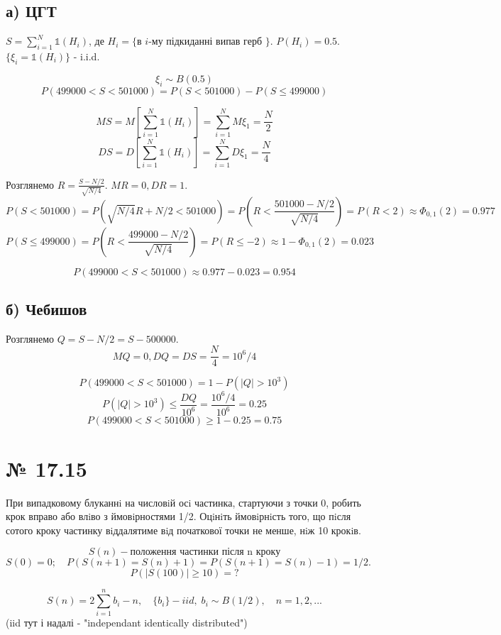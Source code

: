 \documentclass[11pt, a4paper]{article} %
\begin{document}
\subsection*{а) ЦГТ}
$S = \sum_{i=1}^N \mathbb{1}(H_i)$, де $H_i = \{$в $i$-му підкиданні випав герб $\}$.
$P(H_i) = 0.5$. $\{\xi_i = \mathbb{1}(H_i)\}$ - i.i.d.

$$\xi_i \sim B(0.5)$$
$$P(499000 < S < 501000) = P(S < 501000) - P(S \le 499000)$$

$$MS = M\left[\sum_{i=1}^N \mathbb{1}(H_i)\right] = \sum_{i=1}^N M\xi_1 = \frac{N}{2}$$
$$DS = D\left[\sum_{i=1}^N \mathbb{1}(H_i)\right] = \sum_{i=1}^N D\xi_1 = \frac{N}{4}$$

Розглянемо $R = \frac{S - N/2}{\sqrt{N/4}}$. $MR = 0, DR = 1$.
$$P(S < 501000) = P(\sqrt{N/4}R + N/2 < 501000) = P(R < \frac{501000 - N/2}{\sqrt{N/4}}) = P(R < 2) \approx \Phi_{0,1}(2) = 0.977$$
$$P(S \le 499000) = P(R < \frac{499000 - N/2}{\sqrt{N/4}}) = P(R \le -2) \approx 1-\Phi_{0,1}(2) = 0.023$$
\begin{mdframed}[style=ans]
    $$P(499000 < S < 501000) \approx 0.977 - 0.023 = 0.954$$
\end{mdframed}

\subsection*{б) Чебишов}
Розглянемо $Q = S - N/2 = S - 500000$.
$$MQ = 0, DQ = DS = \frac{N}{4} = 10^6 / 4$$

$$P(499000 < S < 501000) = 1 - P(|Q| > 10^3)$$
$$ P(|Q| > 10^3) \le \frac{DQ}{10^6} = \frac{10^6 / 4}{10^6} = 0.25$$
$$P(499000 < S < 501000) \ge 1 - 0.25 = 0.75$$


\section*{№ 17.15}
\begin{mdframed}
    При випадковому блуканнi на числовiй осi частинка, стартуючи з точки 0, 
    робить крок вправо або влiво з ймовiрностями 1/2. Оцiнiть ймовiрнiсть того, що
    пiсля сотого кроку частинку вiддалятиме вiд початкової точки не менше, нiж 10
    крокiв.
\end{mdframed}

\[S(n) - \text{положення частинки після n кроку}\]
\[S(0) = 0; \quad P(S(n+1)=S(n)+1) = P(S(n+1)=S(n)-1) = 1/2.\]
\[\boxed{P(|S(100)| \ge 10) = ?}\]

\[S(n) = 2\sum_{i=1}^n b_i - n, \quad \{b_i\} - iid, \; b_i \sim B(1/2), \quad n = 1,2,...\]
(iid тут і надалі - "independant identically distributed")
\end{document}

